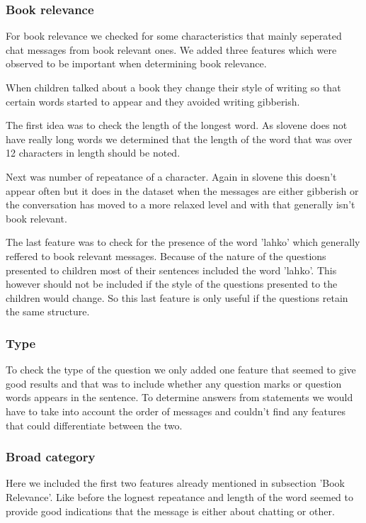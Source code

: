 \documentclass[11pt,a4paper]{article}
\begin{document}
\subsubsection{Book relevance}

For book relevance we checked for some characteristics that mainly seperated chat messages from book relevant ones.
We added three features which were observed to be important when determining book relevance.

When children talked about a book they change their style of writing so that certain words started to appear and they avoided writing gibberish.

The first idea was to check the length of the longest word.
As slovene does not have really long words we determined that the length of the word that was over 12 characters in length should be noted.

Next was number of repeatance of a character. 
Again in slovene this doesn't appear often but it does in the dataset when the messages are either gibberish or the conversation has moved to a more relaxed level and with that generally isn't book relevant.

The last feature was to check for the presence of the word 'lahko' which generally reffered to book relevant messages.
Because of the nature of the questions presented to children most of their sentences included the word 'lahko'.
This however should not be included if the style of the questions presented to the children would change.
So this last feature is only useful if the questions retain the same structure.

\subsubsection{Type}

To check the type of the question we only added one feature that seemed to give good results and that was to include whether any question marks or question words appears in the sentence.
To determine answers from statements we would have to take into account the order of messages and couldn't find any features that could differentiate between the two.

\subsubsection{Broad category}

Here we included the first two features already mentioned in subsection 'Book Relevance'.
Like before the lognest repeatance and length of the word seemed to provide good indications that the message is either about chatting or other.
\end{document}
